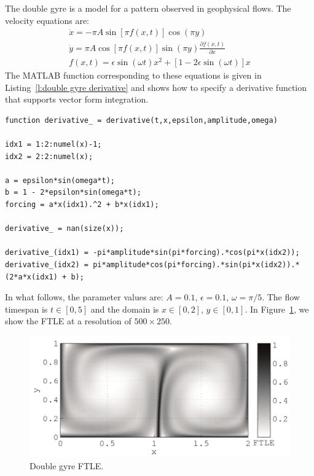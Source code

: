 \documentclass{article}
\begin{document}
The double gyre is a model for a pattern observed in geophysical flows\parencite{shadden05:_defin_lagran_lyapun}. The velocity equations are:
\begin{equation}
\begin{split}
\dot x = -\pi A \sin[\pi f(x,t)] \cos(\pi y)\\
\dot y = \pi A \cos[\pi f(x,t)] \sin(\pi y) \frac{\partial f(x,t)}{\partial x}\\
f(x,t) = \epsilon \sin(\omega t) x^2 + [1 - 2 \epsilon \sin(\omega t)] x
\end{split}
\label{e:double gyre derivative equations}
\end{equation}
The MATLAB function corresponding to these equations is given in Listing~\ref{l:double gyre derivative} and shows how to specify a derivative function that supports vector form integration.

\begin{lstlisting}[caption={Double gyre derivative function corresponding to Equations~\ref{e:double gyre derivative equations}.},label=l:double gyre derivative]
function derivative_ = derivative(t,x,epsilon,amplitude,omega)

idx1 = 1:2:numel(x)-1;
idx2 = 2:2:numel(x);

a = epsilon*sin(omega*t);
b = 1 - 2*epsilon*sin(omega*t);
forcing = a*x(idx1).^2 + b*x(idx1);

derivative_ = nan(size(x));

derivative_(idx1) = -pi*amplitude*sin(pi*forcing).*cos(pi*x(idx2));
derivative_(idx2) = pi*amplitude*cos(pi*forcing).*sin(pi*x(idx2)).*(2*a*x(idx1) + b);
\end{lstlisting}

In what follows, the parameter values are: $A = 0.1$, $\epsilon = 0.1$, $\omega = \pi/5$. The flow timespan is $t \in [0,5]$ and the domain is $x \in [0,2]$, $y \in [0,1]$. In Figure~\ref{f:double gyre FTLE}, we show the FTLE at a resolution of $500\times250$.

\begin{figure}
\begin{center}
\includegraphics[width=\textwidth]{graphics/double_gyre/ftle}
\end{center}
\caption{Double gyre FTLE.}
\label{f:double gyre FTLE}
\end{figure}
\end{document}
